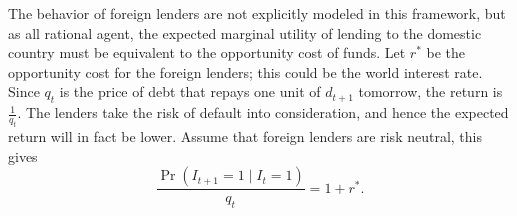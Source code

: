 The behavior of foreign lenders are not explicitly modeled in this framework, but as all rational agent, the expected marginal utility of lending to the domestic country must be equivalent to the opportunity cost of funds.
Let $r^*$ be the opportunity cost for the foreign lenders; this could be the world interest rate. Since $q_t$ is the price of debt that repays one unit of $d_{t+1}$ tomorrow, the return is $\frac{1}{q_t}$. The lenders take the risk of default into consideration, and hence the expected return will in fact be lower. Assume that foreign lenders are risk neutral, this gives
\begin{equation}
    \label{eq:lender}
    \frac{\Pr(I_{t+1}=1 \mid I_{t}=1)}{q_t} = 1 + r^* .
\end{equation}
